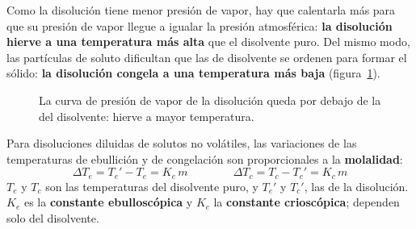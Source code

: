 Como la disolución tiene menor presión de vapor, hay que calentarla más para que su presión de vapor llegue a igualar la presión
atmosférica: \textbf{la disolución hierve a una temperatura más alta} que el disolvente puro. Del mismo modo, las partículas de
soluto dificultan que las de disolvente se ordenen para formar el sólido: \textbf{la disolución congela a una temperatura más
baja} (figura~\ref{fig:ud2-diagrama}).

\begin{figure}[H]
    \centering
    \caption{La curva de presión de vapor de la disolución queda por debajo de la del disolvente: hierve a mayor temperatura.}
    \label{fig:ud2-diagrama}
\end{figure}

\begin{definition}
    Para disoluciones diluidas de solutos no volátiles, las variaciones de las temperaturas de ebullición y de congelación son
    proporcionales a la \textbf{molalidad}:
    \[ \Delta T_e = T_e' - T_e = K_e \, m \qquad\qquad \Delta T_c = T_c - T_c' = K_c \, m \]
    \(T_e\) y \(T_c\) son las temperaturas del disolvente puro, y \(T_e'\) y \(T_c'\), las de la disolución. \(K_e\) es la
    \textbf{constante ebulloscópica} y \(K_c\) la \textbf{constante crioscópica}; dependen solo del disolvente.
\end{definition}

